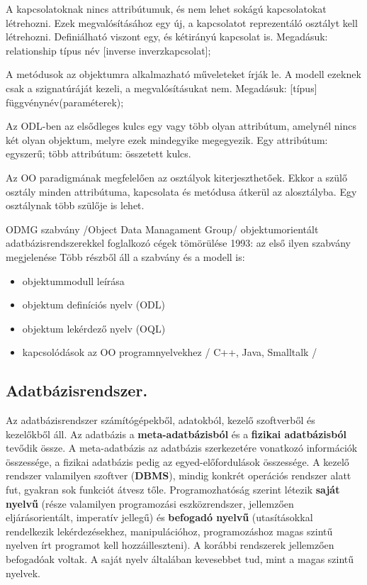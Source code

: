 A kapcsolatoknak nincs attribútumuk, és nem lehet sokágú kapcsolatokat létrehozni. Ezek megvalósításához egy új, a kapcsolatot reprezentáló osztályt kell létrehozni. Definiálható viszont egy, és kétirányú kapcsolat is. Megadásuk: relationship típus név [inverse inverzkapcsolat];

A metódusok az objektumra alkalmazható műveleteket írják le. A modell ezeknek csak a szignatúráját kezeli, a megvalósításukat nem. Megadásuk: [típus] függvénynév(paraméterek); 

Az ODL-ben az elsődleges kulcs egy vagy több olyan attribútum, amelynél nincs két olyan objektum, melyre ezek mindegyike megegyezik. Egy attribútum: egyszerű; több attribútum: összetett kulcs.

Az OO paradigmának megfelelően az osztályok kiterjeszthetőek. Ekkor a szülő osztály minden attribútuma, kapcsolata és metódusa átkerül az alosztályba. Egy osztálynak több szülője is lehet.

ODMG szabvány /Object Data Managament Group/ objektumorientált adatbázisrendszerekkel
foglalkozó cégek tömörülése
1993: az első ilyen szabvány megjelenése
Több részből áll a szabvány és a modell is:
\begin{itemize}
	\item objektummodull leírása
	\item objektum definíciós nyelv (ODL)
	\item objektum lekérdező nyelv (OQL)
	\item kapcsolódások az OO programnyelvekhez / C++, Java, Smalltalk /
\end{itemize}


\subsection{Adatbázisrendszer.}
Az adatbázisrendszer számítógépekből, adatokból, kezelő szoftverből és kezelőkből áll. Az adatbázis a \textbf{meta-adatbázisból} és a \textbf{fizikai adatbázisból} tevődik össze. A meta-adatbázis az adatbázis szerkezetére vonatkozó információk összessége, a fizikai adatbázis pedig az egyed-előfordulások összessége. A kezelő rendszer valamilyen szoftver (\textbf{DBMS}), mindig konkrét operációs rendszer alatt fut, gyakran sok funkciót átvesz tőle. Programozhatóság szerint létezik \textbf{saját nyelvű} (része valamilyen programozási eszközrendszer, jellemzően eljárásorientált, imperatív jellegű) és \textbf{befogadó nyelvű} (utasításokkal rendelkezik lekérdezésekhez, manipulációhoz, programozáshoz magas szintű nyelven írt programot kell hozzáilleszteni). A korábbi rendszerek jellemzően befogadóak voltak. A saját nyelv általában kevesebbet tud, mint a magas szintű nyelvek.

